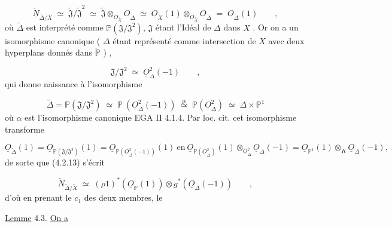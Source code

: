 \begin{equation}\tag{4.2.13}
\underline{\check{N}}_{\widetilde{\Delta}/\widetilde{X}} \;\simeq\; \widetilde{\mathfrak{J}}/\widetilde{\mathfrak{J}}^2 \;\simeq\; \widetilde{\mathfrak{J}} \otimes_{\underline{O}_{\widetilde{X}}} O_{\widetilde{\Delta}} \;\simeq\; \underline{O}_{\widetilde{X}}(1) \otimes_{\underline{O}_{\widetilde{X}}} \underline{O}_{\widetilde{\Delta}} \;=\; \underline{O}_{\widetilde{\Delta}}(1) \qquad ,
\end{equation}
où $\widetilde{\Delta}$ est interprété comme $\mathbb{P}(\mathfrak{J}/\mathfrak{J}^2)$, $\mathfrak{J}$ étant l'Idéal de $\Delta$ dans $X$ . Or on a un isomorphisme canonique ( $\Delta$ étant représenté comme intersection de $X$ avec deux hyperplans  donnés dans $\check{\mathbb{P}}$ ) ,

\begin{equation*}
\mathfrak{J}/\mathfrak{J}^2 \;\simeq\; \underline{O}^2_\Delta(-1) \qquad ,
\end{equation*}
qui donne naissance à l'isomorphisme

\begin{equation*}
\widetilde{\Delta} = \mathbb{P}(\mathfrak{J}/\mathfrak{J}^2) \;\simeq\; \mathbb{P} \ (\underline{O}^2_\Delta(-1)) \;\stackrel{\alpha}{\simeq}\; \mathbb{P}(\underline{O}^2_\Delta) \;\simeq\; \Delta \times \mathbb{P}^1
\end{equation*}
où $\alpha$ est l'isomorphisme canonique EGA II 4.1.4. Par loc. cit. cet isomorphisme transforme

\begin{equation*}
\underline{O}_{\widetilde{\Delta}}(1) = \underline{O}_{\mathbb{P}(\mathfrak{J}/\mathfrak{J}^2)}(1) = \underline{O}_{\mathbb{P}(\underline{O}^2_\Delta(-1))}(1) \ \text{en} \ \underline{O}_{\mathbb{P}(\underline{O}^2_\Delta)}(1) \otimes_{\underline{O}^2_\Delta} \underline{O}_\Delta(-1) = \underline{O}_{\mathbb{P}^1}(1) \otimes_K \underline{O}_\Delta(-1),
\end{equation*}
de sorte que (4.2.13) s'écrit

\begin{equation}\tag{4.2.14}
\check{N}_{\widetilde{\Delta}/\widetilde{X}} \;\simeq\; (\rho 1)^*(\underline{O}_{\mathbb{P}}(1)) \otimes g^*(\underline{O}_\Delta(-1)) \qquad ,
\end{equation}
d'où en prenant le $c_1$ des deux membres, le 



\underline{Lemme} 4.3. \underline{On a}

